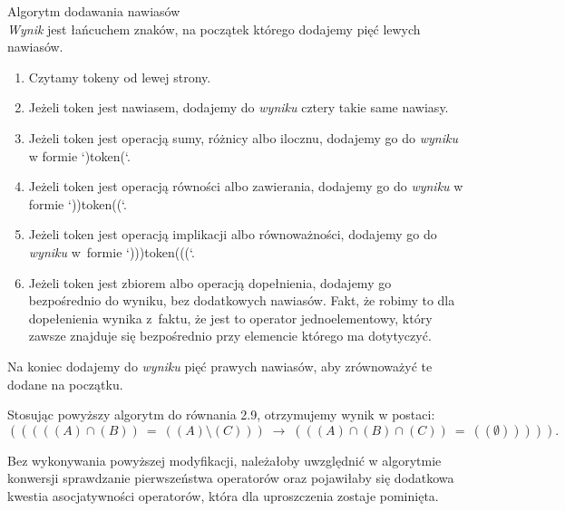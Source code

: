 \documentclass{SGGW-thesis}
\begin{document}
\begin{paragraph}{Algorytm dodawania nawiasów\\}
    \emph{Wynik} jest łańcuchem znaków, na początek którego dodajemy pięć lewych nawiasów. 
    \begin{enumerate}
        \item Czytamy tokeny od lewej strony.
        \item Jeżeli token jest nawiasem, dodajemy do \emph{wyniku} cztery takie same nawiasy.
        \item Jeżeli token jest operacją sumy, różnicy albo ilocznu, dodajemy go do \emph{wyniku} w formie `)token(`.
        \item Jeżeli token jest operacją równości albo zawierania, dodajemy go do \emph{wyniku} w formie `))token((`.
        \item Jeżeli token jest operacją implikacji albo równoważności, dodajemy go do \emph{wyniku} w~formie `)))token(((`.
        \item Jeżeli token jest zbiorem albo operacją dopełnienia, dodajemy go bezpośrednio do wyniku, bez dodatkowych nawiasów. Fakt, że robimy to dla dopełenienia wynika z~faktu, że jest to operator jednoelementowy, który zawsze znajduje się bezpośrednio przy elemencie którego ma dotytyczyć.
    \end{enumerate}

    Na koniec dodajemy do \emph{wyniku} pięć prawych nawiasów, aby zrównoważyć te dodane na początku.
    
    Stosując powyższy algorytm do równania 2.9, otrzymujemy wynik w postaci:
    \begin{equation}
            \left( \left( \left( \left(
            \left( A \right) 
            \cap 
            \left( B \right)
            \right) \: = \: \left(
            \left( A \right) 
            \setminus 
            \left( C \right)
            \right) \right) \;\rightarrow\; \left( \left( 
            \left( A \right) 
            \cap 
            \left( B \right)
            \cap
            \left( C \right)
            \right) \: = \: \left(
            \left( \emptyset \right) \right) \right) \right) \right).
        \label{eq:example_tautology_parenthesized}
    \end{equation}

    Bez wykonywania powyższej modyfikacji, należałoby uwzględnić w algorytmie konwersji sprawdzanie pierwszeństwa operatorów oraz pojawiłaby się dodatkowa kwestia asocjatywności operatorów, która dla uproszczenia zostaje pominięta.
\end{paragraph}
\end{document}
